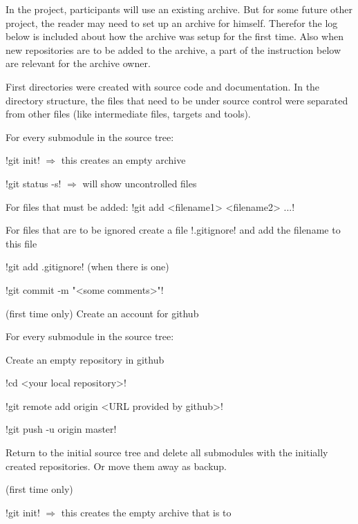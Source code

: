 In the project, participants will use an existing archive. But for some
future other project, the reader may need to set up an archive for himself.
Therefor the log below is included about how the archive was setup for the
first time. Also when new repositories are to be added to the archive, a part
of the instruction below are relevant for the archive owner.

First directories were created with source code and documentation. In the
directory structure, the files that need to be under source control were
separated from other files (like intermediate files, targets and tools).

\begin{itemize*}
\item For every submodule in the source tree:
   \begin{itemize*}
   \item !git init! $\Rightarrow$ this creates an empty archive
   \item !git status -s! $\Rightarrow$ will show uncontrolled files
   \item For files that must be added: !git add <filename1> <filename2> ...!
   \item For files that are to be ignored create a file !.gitignore! and add
         the filename to this file
   \item !git add .gitignore! (when there is one)
   \item !git commit -m "<some comments>"!
   \end{itemize*}
\item (first time only) Create an account for github
\item For every submodule in the source tree:
   \begin{itemize*}
   \item Create an empty repository in github
   \item !cd <your local repository>!
   \item !git remote add origin <URL provided by github>!
   \item !git push -u origin master!
   \end{itemize*}
\item Return to the initial source tree and delete all submodules with the
      initially created repositories. Or move them away as backup.
\item (first time only)
   \begin{itemize*}
   \item !git init! $\Rightarrow$ this creates the empty archive that is to

\end{itemize*}
\end{itemize*}
